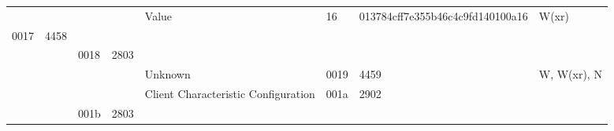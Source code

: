 \documentclass[conference]{IEEEtran}
\begin{document}
\begin{landscape}
\begin{table}[ht]
\begin{tabular}{@{}llllllll@{}}
                            &                             &                              &                              & Value                                                                                  & 16                       & 013784cff7e355b46c4c9fd140100a16 & W(xr)                                                                                                              \\
\rowcolor[HTML]{3166FF} 
{\color[HTML]{000000} 0017} & {\color[HTML]{000000} 4458} & {\color[HTML]{000000} }      & {\color[HTML]{000000} }      & {\color[HTML]{000000} }                                                                & {\color[HTML]{000000} }  & {\color[HTML]{000000} }          & {\color[HTML]{000000} }                                                                                            \\
                            &                             & \cellcolor[HTML]{FFFE65}0018 & \cellcolor[HTML]{FFFE65}2803 & \cellcolor[HTML]{FFFE65}                                                               & \cellcolor[HTML]{FFFE65} & \cellcolor[HTML]{FFFE65}         & \cellcolor[HTML]{FFFE65}                                                                                           \\
                            &                             &                              &                              & Unknown                                                                                & 0019                     & 4459                             & W, W(xr), N                                                                                                        \\
                            &                             &                              &                              & Client Characteristic Configuration                                                    & 001a                     & 2902                             &                                                                                                                    \\
                            &                             & \cellcolor[HTML]{FFFE65}001b & \cellcolor[HTML]{FFFE65}2803 & \cellcolor[HTML]{FFFE65}                                                               & \cellcolor[HTML]{FFFE65} & \cellcolor[HTML]{FFFE65}         & \cellcolor[HTML]{FFFE65}                                                                                           \\

\end{tabular}
\end{table}
\end{landscape}
\end{document}
